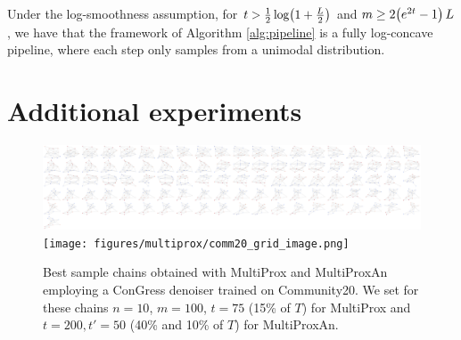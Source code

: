 \begin{theorem}
    \label{thm:logconcavepipe}
    Under the log-smoothness assumption, for $t> \frac{1}{2}\log\mathopen{}\left(1 + \frac{L}{2}\right)$ and $m \geq 2\mathopen{}\left(e^{2t} - 1\right)L$, we have that the framework of Algorithm \ref{alg:pipeline} is a fully log-concave pipeline, where each step only samples from a unimodal distribution.
\end{theorem}

\section{Additional experiments}
\label{sec:appendix_multiprox_experiments}

\begin{figure}[H]
    \centering
    \includegraphics[width=\linewidth]{figures/multiprox/comm20_grid_image_single_noise.png}
    \texttt{[image: figures/multiprox/comm20\_grid\_image.png]}
    \caption[Best sample chains obtained with MultiProx and MultiProxAn employing a ConGress denoiser trained on Community20.]{Best sample chains obtained with MultiProx and MultiProxAn employing a ConGress denoiser trained on Community20. We set for these chains $n=10$, $m=100$, $t=75$ (15\% of $T$) for MultiProx and $t=200, t'=50$ (40\% and 10\% of $T$) for MultiProxAn.}
    \label{fig:comm20_extra}
\end{figure}


